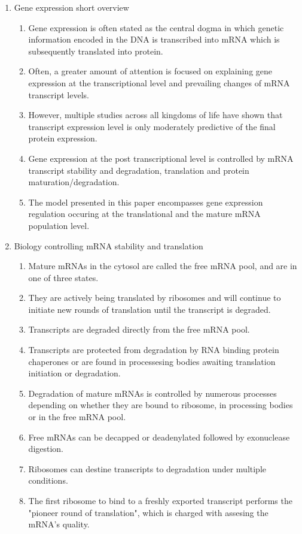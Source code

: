 \documentclass[review]{elsarticle}
\begin{document}
\begin{enumerate}%
	\item Gene expression short overview
	\begin{enumerate}
		\item Gene expression is often stated as the central dogma in which genetic information encoded in the DNA is transcribed into mRNA which is subsequently translated into protein. 
		\item Often, a greater amount of attention is focused on explaining gene expression at the transcriptional level and prevailing changes of mRNA transcript levels. 
		\item However, multiple studies across all kingdoms of life have shown that transcript expression level is only moderately predictive of the final protein expression.
		\item Gene expression at the post transcriptional level is controlled by mRNA transcript stability and degradation, translation and protein maturation/degradation.
		\item The model presented in this paper encompasses gene expression regulation occuring at the translational and the mature mRNA population level.
	\end{enumerate}
	\item Biology controlling mRNA stability and translation
	\begin{enumerate}
		\item Mature mRNAs in the cytosol are called the free mRNA pool, and are in one of three states. 
		\item They are actively being translated by ribosomes and will continue to initiate new rounds of translation until the transcript is degraded.
		\item Transcripts are degraded directly from the free mRNA pool.
		\item Transcripts are protected from degradation by RNA binding protein chaperones or are found in processesing bodies awaiting translation initiation or degradation.
		\item Degradation of mature mRNAs is controlled by numerous processes depending on whether they are bound to ribosome, in processing bodies or in the free mRNA pool.
		\item Free mRNAs can be decapped or deadenylated followed by exonuclease digestion.
		\item Ribosomes can destine transcripts to degradation under multiple conditions. 
		\item The first ribosome to bind to a freshly exported transcript performs the "pioneer round of translation", which is charged with assesing the mRNA's quality.

\end{enumerate}
\end{enumerate}
\end{document}
